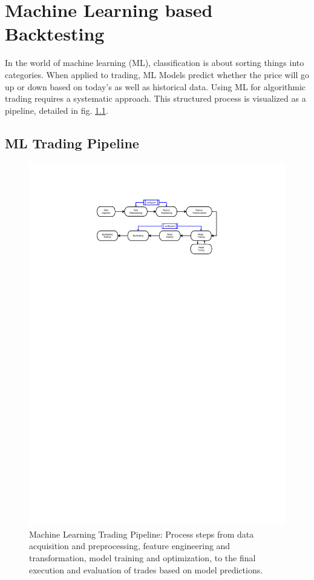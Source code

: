 \chapter{Machine Learning based Backtesting}\label{chap:ml_bactesting}

In the world of machine learning (ML), classification is about sorting things into categories.
When applied to trading, ML Models predict whether the price will go up or down based on today's as well as historical data.
Using ML for algorithmic trading requires a systematic approach.
This structured process is visualized as a pipeline, detailed in fig. \ref{fig:ml_pipeline}.

\section{ML Trading Pipeline} \label{sec:ml_pipeline}


\begin{figure}[H]
\centering
\includegraphics[trim=25mm 220mm 55mm 30mm, width=1.2\textwidth, clip]{./pdf/ml_pipeline.pdf}
\caption{Machine Learning Trading Pipeline: Process steps from data acquisition and preprocessing, feature engineering and transformation, model training and optimization, to the final execution and evaluation of trades based on model predictions.}
\label{fig:ml_pipeline}
\end{figure}

